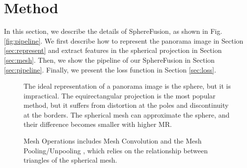 \section{Method}
\label{sec:method}


In this section, we describe the details of SphereFusion, as shown in Fig. \ref{fig:pipeline}.
We first describe how to represent the panorama image in Section \ref{sec:represent} and extract features in the spherical projection in Section \ref{sec:mesh}. 
Then, we show the pipeline of our SphereFusion in Section \ref{sec:pipeline}.
Finally, we present the loss function in Section \ref{sec:loss}.


\begin{figure*} [t]
	\begin{center}

		\hspace{0.1em}
        \hspace{0.1em}
  
	\end{center}
    \vspace{-1.5em}
	\caption{
        The ideal representation of a panorama image is the sphere, but it is impractical. The equirectangular projection is the most popular method, but it suffers from distortion at the poles and discontinuity at the borders. The spherical mesh can approximate the sphere, and their difference becomes smaller with higher MR.
	}
    \vspace{-2.0em}
	\label{fig:projections}
\end{figure*}


\begin{figure} [t]
	\begin{center}
		\vspace{0.1em}
  
	\end{center}
    \vspace{-2.0em}
	\caption{
		Mesh Operations includes Mesh Convolution and the Mesh Pooling/Unpooling \cite{yan2022spheredepth}, which relies on the relationship between triangles of the spherical mesh. 
	}
    \vspace{-1.5em}
	\label{fig:mesh_op}
\end{figure}


